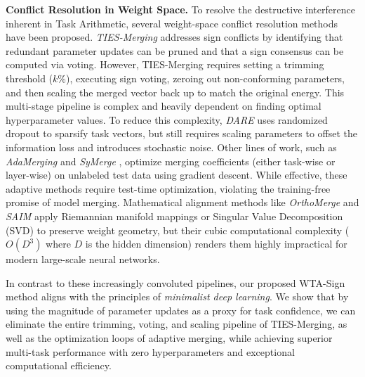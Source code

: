 \textbf{Conflict Resolution in Weight Space.}
To resolve the destructive interference inherent in Task Arithmetic, several weight-space conflict resolution methods have been proposed.
\emph{TIES-Merging} \cite{yadav2023ties} addresses sign conflicts by identifying that redundant parameter updates can be pruned and that a sign consensus can be computed via voting.
However, TIES-Merging requires setting a trimming threshold ($k\%$), executing sign voting, zeroing out non-conforming parameters, and then scaling the merged vector back up to match the original energy.
This multi-stage pipeline is complex and heavily dependent on finding optimal hyperparameter values.
To reduce this complexity, \emph{DARE} \cite{yu2024dare} uses randomized dropout to sparsify task vectors, but still requires scaling parameters to offset the information loss and introduces stochastic noise.
Other lines of work, such as \emph{AdaMerging} \cite{yang2023adamerging} and \emph{SyMerge} \cite{yang2024symerge}, optimize merging coefficients (either task-wise or layer-wise) on unlabeled test data using gradient descent.
While effective, these adaptive methods require test-time optimization, violating the training-free promise of model merging.
Mathematical alignment methods like \emph{OrthoMerge} and \emph{SAIM} apply Riemannian manifold mappings or Singular Value Decomposition (SVD) to preserve weight geometry, but their cubic computational complexity ($O(D^3)$ where $D$ is the hidden dimension) renders them highly impractical for modern large-scale neural networks.

In contrast to these increasingly convoluted pipelines, our proposed WTA-Sign method aligns with the principles of \emph{minimalist deep learning}.
We show that by using the magnitude of parameter updates as a proxy for task confidence, we can eliminate the entire trimming, voting, and scaling pipeline of TIES-Merging, as well as the optimization loops of adaptive merging, while achieving superior multi-task performance with zero hyperparameters and exceptional computational efficiency.
